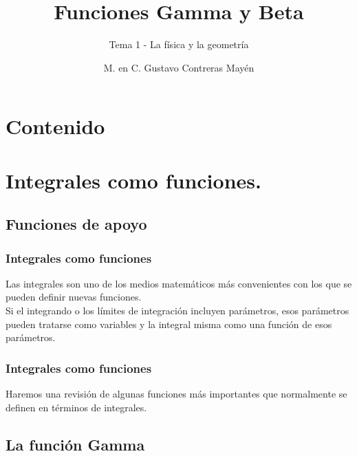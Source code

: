 \documentclass[12pt]{beamer}
\title{\large{Funciones Gamma y Beta}}
\subtitle{Tema 1 - La física y la geometría}
\author{M. en C. Gustavo Contreras Mayén}
\date{}
\begin{document}
\maketitle
\fontsize{14}{14}\selectfont
{}

\section*{Contenido}

\section{Integrales como funciones.}
\subsection{Funciones de apoyo}

\begin{frame}
\frametitle{Integrales como funciones}
Las integrales son uno de los medios matemáticos más convenientes con los que se pueden definir nuevas funciones.
\\
\bigskip
\pause
Si el integrando o los límites de integración incluyen parámetros, esos parámetros pueden tratarse como variables y la integral misma como una función de esos parámetros.
\end{frame}
\begin{frame}
\frametitle{Integrales como funciones}
Haremos una revisión de algunas funciones más importantes que normalmente se definen en términos de integrales.
\end{frame}

\subsection*{La función Gamma}
\end{document}
